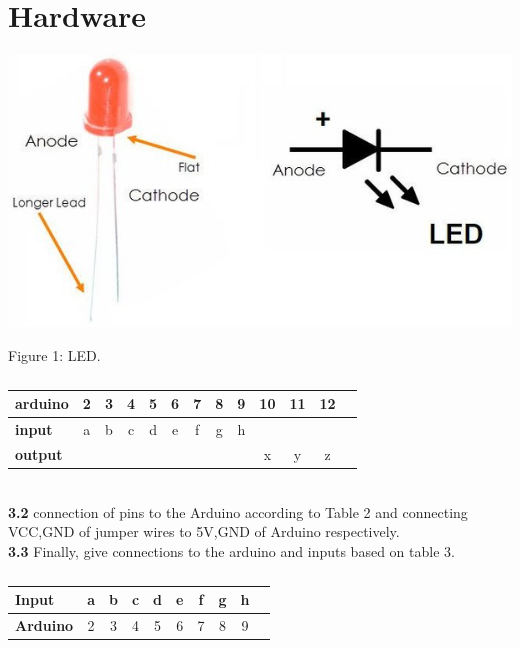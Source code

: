 \documentclass[10pt, a4paper]{article}
\begin{document}
	\section{Hardware}
    \begin{center}
\includegraphics[scale=.20]{led.jpeg}
\end{center}
Figure 1: LED.
	\begin{table}[htbp]
    \begin{center}
    \begin{tabular}{|l|c|c|c|c|c|c|c|c|c|c|c|c} \hline \textbf{arduino}
  & 2 & 3 & 4 & 5 & 6 & 7 & 8 & 9 & 10 & 11 & 12 \\
 \hline
 \textbf{input} & a & b & c & d & e & f & g & h & & &  \\ \hline
\textbf{output} & & & & & & & &  & x & y & z \\ \hline
\end{tabular}   
\end{center}
\caption{\label{table:dummytable} }
\end{table}
\\	\textbf{3.2}
	connection of pins to the Arduino according to Table 2 and connecting VCC,GND of jumper wires to 5V,GND of Arduino respectively.
\\ \textbf{3.3}
Finally, give connections to the arduino and inputs based on table 3.
	\begin{table}[htbp]
    \begin{center}
    \begin{tabular}{|l|c|c|c|c|c|c|c|c|c|} \hline 
 
\textbf{Input} & a & b & c & d & e & f & g & h  \\ \hline
\textbf{Arduino} & 2 & 3 & 4 & 5& 6 & 7 & 8 & 9\\ \hline
\end{tabular}   
\end{center}
\caption{\label{table:dummytable} }
\end{table}
\end{document}
